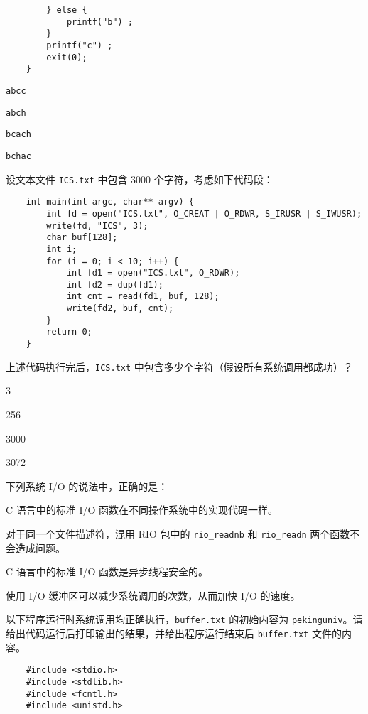 \begin{problems}
\begin{verbatim}
        } else {
            printf("b") ;
        }
        printf("c") ;
        exit(0);
    }
        \end{verbatim}
        \begin{choices}
            \item \verb|abcc|
            \item \verb|abch|
            \item \verb|bcach|
            \item \verb|bchac|
        \end{choices}
         设文本文件 \verb|ICS.txt| 中包含 3000 个字符，考虑如下代码段：
        \begin{verbatim}
    int main(int argc, char** argv) {
        int fd = open("ICS.txt", O_CREAT | O_RDWR, S_IRUSR | S_IWUSR);
        write(fd, "ICS", 3);
        char buf[128];
        int i;
        for (i = 0; i < 10; i++) {
            int fd1 = open("ICS.txt", O_RDWR);
            int fd2 = dup(fd1);
            int cnt = read(fd1, buf, 128);
            write(fd2, buf, cnt);
        }
        return 0; 
    }
        \end{verbatim}
        上述代码执行完后，\verb|ICS.txt| 中包含多少个字符（假设所有系统调用都成功）？
        \begin{choices}
            \item 3
            \item 256
            \item 3000
            \item 3072
        \end{choices}
         下列系统 I/O 的说法中，正确的是：
        \begin{choices}
            \item C 语言中的标准 I/O 函数在不同操作系统中的实现代码一样。
            \item 对于同一个文件描述符，混用 RIO 包中的 \verb|rio_readnb| 和 \verb|rio_readn| 两个函数不会造成问题。
            \item C 语言中的标准 I/O 函数是异步线程安全的。
            \item 使用 I/O 缓冲区可以减少系统调用的次数，从而加快 I/O 的速度。
        \end{choices}
         以下程序运行时系统调用均正确执行，\verb|buffer.txt| 的初始内容为 \verb|pekinguniv|。请给出代码运行后打印输出的结果，并给出程序运行结束后 \verb|buffer.txt| 文件的内容。
        \begin{verbatim}
    #include <stdio.h>
    #include <stdlib.h>
    #include <fcntl.h>
    #include <unistd.h>


\end{verbatim}
\end{problems}
